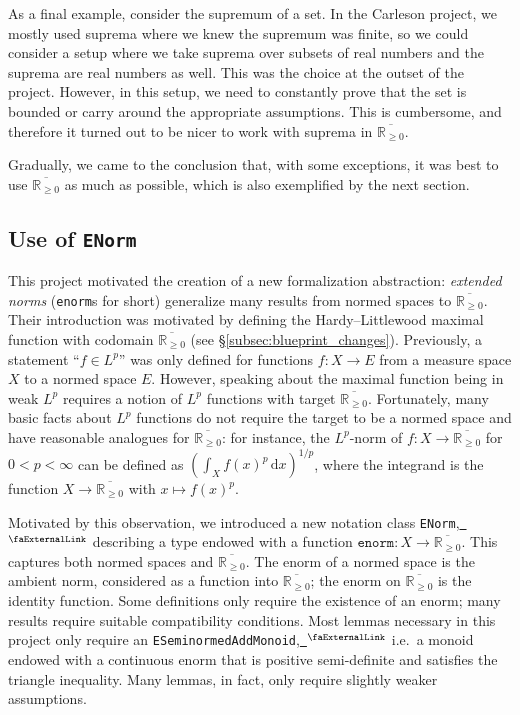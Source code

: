 \documentclass[12pt, reqno]{amsart}
\let\lean\lstinline
\newcommand*{\ud}{\, \mathrm{d}}
\newcommand*{\real}{\mathbb{R}} %
\newcommand{\ennreal}{\overline{\real_{\ge0}}}
\newcommand{\extlink}{~\ensuremath{{}^\text{\faExternalLink}}}
\theoremstyle{definition}
\theoremstyle{plain}
\begin{document}
As a final example, consider the supremum of a set.
In the Carleson project, we mostly used suprema where we knew the supremum was finite,
so we could consider a setup where we take suprema over subsets of real numbers
and the suprema are real numbers as well.
This was the choice at the outset of the project.
However, in this setup, we need to constantly prove that the set is bounded
or carry around the appropriate assumptions.
This is cumbersome, and therefore it turned out to be nicer to
work with suprema in $\ennreal$.

Gradually, we came to the conclusion that, with some exceptions, it was best to use $\ennreal$ as much as possible, which is also exemplified by the next section.

\subsection{Use of \texttt{ENorm}}\label{subsec:enorm}

This project motivated the creation of a new formalization abstraction: \emph{extended norms} (\lean{enorm}s for short) generalize many results from normed spaces to $\ennreal$.
Their introduction was motivated by defining the Hardy--Littlewood maximal function with codomain $\ennreal$ (see \S\ref{subsec:blueprint_changes}).
Previously, a statement ``$f\in L^p$'' was only defined for functions $f\colon X\to E$ from a measure space $X$ to a normed space $E$. However, speaking about the maximal function being in weak $L^p$ requires a notion of $L^p$ functions with target $\ennreal$. Fortunately, many basic facts about $L^p$ functions do not require the target to be a normed space and have reasonable analogues for $\ennreal$: for instance, the $L^p$-norm of $f\colon X\to\ennreal$ for $0<p<\infty$ can be defined as $(\int_X f(x)^p \ud x)^{1/p}$, where the integrand is the function $X\to \ennreal$ with $x\mapsto f(x)^p$.

Motivated by this observation, we introduced a new notation class \lean{ENorm},\href{https://github.com/leanprover-community/mathlib4/blob/b63493a4746b4651fceb3bcf3a4651cc36a4b8de/Mathlib/Analysis/Normed/Group/Defs.lean#L70-L74}{\extlink} describing a type endowed with a function $\texttt{enorm}\colon X\to\ennreal$.
This captures both normed spaces and $\ennreal$. The enorm of a normed space is the ambient norm, considered as a function into $\ennreal$; the enorm on $\ennreal$ is the identity function.
Some definitions only require the existence of an enorm; many results require suitable compatibility conditions.
Most lemmas necessary in this project only require an \lean{ESeminormedAddMonoid},\href{https://github.com/leanprover-community/mathlib4/blob/b63493a4746b4651fceb3bcf3a4651cc36a4b8de/Mathlib/Analysis/Normed/Group/Defs.lean#L111-L117}{\extlink} i.e.\ a monoid endowed with a continuous enorm that is positive semi-definite and satisfies the triangle inequality. Many lemmas, in fact, only require slightly weaker assumptions.
\end{document}
